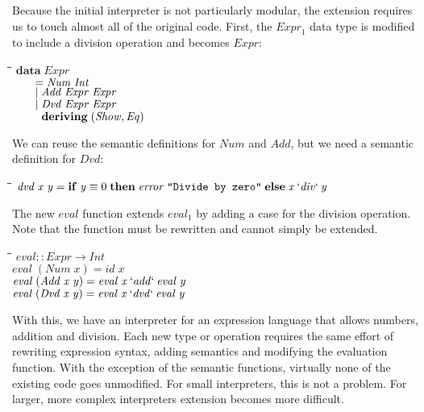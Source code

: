 \documentclass[10pt]{article}
\newlength{\lwidth}\setlength{\lwidth}{4.5cm}
\newlength{\cwidth}\setlength{\cwidth}{8mm} %
\newcommand{\Conid}[1]{\mathit{#1}}
\newcommand{\Varid}[1]{\mathit{#1}}
\begin{document}
Because the initial interpreter is not particularly modular, the
extension requires us to touch almost all of the original code.
First, the \ensuremath{\Varid{Expr}_1} data type is modified to include a division
operation and becomes \ensuremath{\Conid{Expr}}:

\begin{tabbing}
\qquad\=\hspace{\lwidth}\=\hspace{\cwidth}\=\+\kill
${\mathbf{data}\;\Conid{Expr}}$\\
${\hskip2.00em\relax\mathrel{=}\Conid{Num}\;\Conid{Int}}$\\
${\hskip2.00em\relax\mid \Conid{Add}\;\Conid{Expr}\;\Conid{Expr}}$\\
${\hskip2.00em\relax\mid \Conid{Dvd}\;\Conid{Expr}\;\Conid{Expr}}$\\
${\hskip2.00em\relax\phantom{\mid \mbox{}}\mathbf{deriving}\;(\Conid{Show},\Conid{Eq})}$
\end{tabbing}
We can reuse the semantic definitions for \ensuremath{\Conid{Num}} and \ensuremath{\Conid{Add}}, but we need
a semantic definition for \ensuremath{\Conid{Dvd}}:

\begin{tabbing}
\qquad\=\hspace{\lwidth}\=\hspace{\cwidth}\=\+\kill
${\Varid{dvd}\;\Varid{x}\;\Varid{y}\mathrel{=}\mathbf{if}\;\Varid{y}\equiv \mathrm{0}\;\mathbf{then}\;\Varid{error}\;\text{\tt \char34 Divide~by~zero\char34}\;\mathbf{else}\;\Varid{x}\mathbin{\Varid{`div`}}\Varid{y}}$
\end{tabbing}
The new \ensuremath{\Varid{eval}} function extends \ensuremath{\Varid{eval}_1} by adding a case for the
division operation.  Note that the function must be rewritten and
cannot simply be extended.

\begin{tabbing}
\qquad\=\hspace{\lwidth}\=\hspace{\cwidth}\=\+\kill
${\Varid{eval}\mathbin{::}\Conid{Expr}\to \Conid{Int}}$\\
${\Varid{eval}\;(\Conid{Num}\;\Varid{x})\mathrel{=}\Varid{id}\;\Varid{x}}$\\
${\Varid{eval}\;(\Conid{Add}\;\Varid{x}\;\Varid{y})\mathrel{=}\Varid{eval}\;\Varid{x}\mathbin{`\Varid{add}`}\Varid{eval}\;\Varid{y}}$\\
${\Varid{eval}\;(\Conid{Dvd}\;\Varid{x}\;\Varid{y})\mathrel{=}\Varid{eval}\;\Varid{x}\mathbin{`\Varid{dvd}`}\Varid{eval}\;\Varid{y}}$
\end{tabbing}
With this, we have an interpreter for an expression language that
allows numbers, addition and division.  Each new type or operation
requires the same effort of rewriting expression syntax, adding
semantics and modifying the evaluation function.  With the exception
of the semantic functions, virtually none of the existing code goes
unmodified.  For small interpreters, this is not a problem.  For
larger, more complex interpreters extension becomes more difficult.
\end{document}
